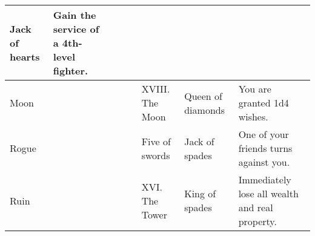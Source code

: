 \begin{longtable}{llllllll}
{\begin{minipage}[t]{0.872in}
Jack of hearts\end{minipage}} & \multicolumn{1}{p{1.000in}|}{\begin{minipage}[t]{1.000in}\raggedright
Gain the service of a 4th-level fighter.\end{minipage}}\\
\hline
\multicolumn{5}{p{2.168in}|}{\begin{minipage}[t]{2.168in}\raggedright
Moon\end{minipage}} & \multicolumn{1}{|p{0.460in}|}{\begin{minipage}[t]{0.460in}\raggedright
XVIII. The Moon\end{minipage}} & \multicolumn{1}{p{0.872in}|}{\begin{minipage}[t]{0.872in}\raggedright
Queen of diamonds\end{minipage}} & \multicolumn{1}{p{1.000in}|}{\begin{minipage}[t]{1.000in}\raggedright
You are granted 1d4 wishes.\end{minipage}}\\
\hline
\multicolumn{5}{p{2.168in}|}{\begin{minipage}[t]{2.168in}\raggedright
Rogue\end{minipage}} & \multicolumn{1}{|p{0.460in}|}{\begin{minipage}[t]{0.460in}\raggedright
Five of swords\end{minipage}} & \multicolumn{1}{p{0.872in}|}{\begin{minipage}[t]{0.872in}\raggedright
Jack of spades\end{minipage}} & \multicolumn{1}{p{1.000in}|}{\begin{minipage}[t]{1.000in}\raggedright
One of your friends turns against you.\end{minipage}}\\
\hline
\multicolumn{5}{p{2.168in}|}{\begin{minipage}[t]{2.168in}\raggedright
Ruin\end{minipage}} & \multicolumn{1}{|p{0.460in}|}{\begin{minipage}[t]{0.460in}\raggedright
XVI. The Tower\end{minipage}} & \multicolumn{1}{p{0.872in}|}{\begin{minipage}[t]{0.872in}\raggedright
King of spades\end{minipage}} & \multicolumn{1}{p{1.000in}|}{\begin{minipage}[t]{1.000in}\raggedright
Immediately lose all wealth and real property.\end{minipage}}\\

\end{longtable}
